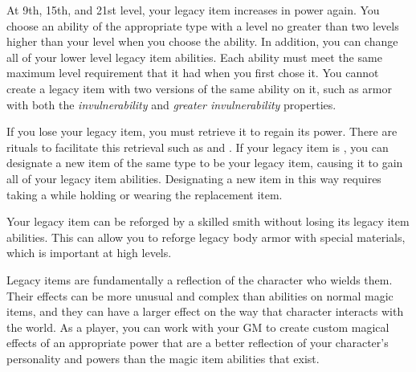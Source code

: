        At 9th, 15th, and 21st level, your legacy item increases in power again.
        You choose an ability of the appropriate type with a level no greater than two levels higher than your level when you choose the ability.
        In addition, you can change all of your lower level legacy item abilities.
        Each ability must meet the same maximum level requirement that it had when you first chose it.
        You cannot create a legacy item with two versions of the same ability on it, such as armor with both the \textit{invulnerability} and \textit{greater invulnerability} properties.

        If you lose your legacy item, you must retrieve it to regain its power.
        There are rituals to facilitate this retrieval such as  and .
        If your legacy item is , you can designate a new item of the same type to be your legacy item, causing it to gain all of your legacy item abilities.
        Designating a new item in this way requires taking a  while holding or wearing the replacement item.

        Your legacy item can be reforged by a skilled smith without losing its legacy item abilities.
        This can allow you to reforge legacy body armor with special materials, which is important at high levels.

            Legacy items are fundamentally a reflection of the character who wields them.
            Their effects can be more unusual and complex than abilities on normal magic items, and they can have a larger effect on the way that character interacts with the world.
            As a player, you can work with your GM to create custom magical effects of an appropriate power that are a better reflection of your character's personality and powers than the magic item abilities that exist.
